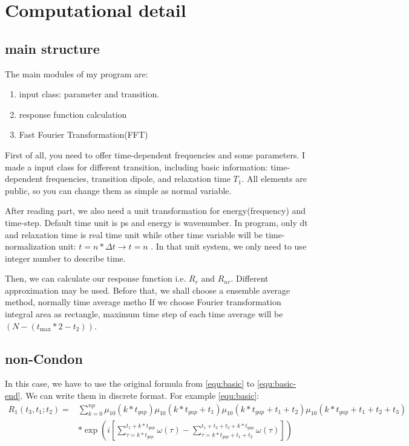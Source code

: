 \documentclass[12pt,a4paper,scale=1.0]{article}
\begin{document}
	\section{Computational detail}
	\subsection{main structure}
	The main modules of my program are:
	\begin{enumerate}
		\item input class: parameter and transition.
		\item response function calculation
		\item Fast Fourier Transformation(FFT)
	\end{enumerate}

	First of all, you need to offer time-dependent frequencies and some parameters. I made a input class for different transition, including basic information: time-dependent frequencies, transition dipole, and relaxation time $T_1$. All elements are public, so you can change them as simple as normal variable. 
	
	After reading part, we also need a unit transformation for energy(frequency) and time-step.  Default time unit is ps and energy is wavenumber. In program, only dt and relaxation time is real time unit while other time variable will be  time-normalization unit: $ t = n * \Delta t\rightarrow t=n$ . In that unit system, we only need to use integer number to describe time. 
	
	Then, we can calculate our response function i.e. $R_r$ and $R_{nr}$. Different approximation may be used. Before that, we shall choose a ensemble average method, normally time average metho If we choose Fourier transformation integral area as rectangle, maximum time step of each time average will be $ ( N-(t_{\text{max}}*2 - t_2) ) $. 
	
	\subsection{non-Condon }
	
	
	  In this case, we have to use the original formula from \ref{equ:basic} to \ref{equ:basic-end}. We can 
	write them in discrete format. For example \ref{equ:basic}:
	\begin{equation}  
	\begin{aligned}
	R_1 (t_3,t_1;t_2) = & \sum_{k=0}^{np} \mu_{10}(k*t_{gap})  \mu_{10}(k*t_{gap}+t_1) \mu_{10}(k*t_{gap}+t_1+t_2) \mu_{10}(k*t_{gap}+t_1+t_2+t_3) \\
	&*  \exp(i [ \sum_{\tau=k*t_{gap}}^{t_1 + k*t_{gap}} \omega(\tau) -  
	\sum_{\tau=k*t_{gap} +t_1 +t_2  }^{t_1 +t_2 +t_3 + k*t_{gap}} \omega(\tau)  ])
	\end{aligned}
	\end{equation}
	
\end{document}
